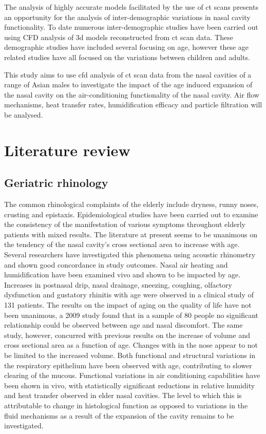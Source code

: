 \documentclass{article}
\begin{document}
The analysis of highly accurate models facilitated by the use of ct scans presents an opportunity for the analysis of inter-demographic variations in nasal cavity functionality. To date numerous inter-demographic studies have been carried out using CFD analysis of 3d models reconstructed from ct scan data. These demographic studies have included several focusing on age, however these age related studies have all focused on the variations between children and adults.

This study aims to use cfd analysis of ct scan data from the nasal cavities of a range of Asian males to investigate the impact of the age induced expansion of the nasal cavity on the air-conditioning functionality of the nasal cavity. Air flow mechanisms, heat transfer rates, humidification efficacy and particle filtration will be analysed.

\section{Literature review}

\subsection{Geriatric rhinology}
The common rhinological complaints of the elderly include dryness, runny noses, crusting and epistaxis\cite{Varga-Huettner2013}. Epidemiological studies have been carried out to examine the consistency of the manifestation of various symptoms throughout elderly patients with mixed results. The literature at present seems to be unanimous on the tendency of the nasal cavity's cross sectional area to increase with age. Several researchers have investigated this phenomena using acoustic rhinometry and shown good concordance in study outcomes\cite{Kalmovich2005, Edelstein1996,WhanKim2007,Lindemann2008}. Nasal air heating and humidification have been examined vivo and shown to be impacted by age\cite{Lindemann2008}. Increases in postnasal drip, nasal drainage, sneezing, coughing, olfactory dysfunction and gustatory rhinitis with age were observed in a clinical study of 131 patients\cite{Edelstein1996}. The results on the impact of aging on the quality of life have not been unanimous, a 2009 study found that in a sample of 80 people no significant relationship could be observed between age and nasal discomfort\cite{Lindemann2010}. The same study, however, concurred with previous results on the increase of volume and cross sectional area as a function of age. Changes with in the nose appear to not be limited to the increased volume. Both functional and structural variations in the respiratory epithelium have been observed with age, contributing to slower clearing of the mucous\cite{HO2001}. Functional variations in air conditioning capabilities have been shown in vivo\cite{Lindemann2008}, with statistically significant reductions in relative humidity and heat transfer observed in elder nasal cavities. The level to which this is attributable to change in histological function as opposed to variations in the fluid mechanisms as a result of the expansion of the cavity remains to be investigated.
\end{document}
